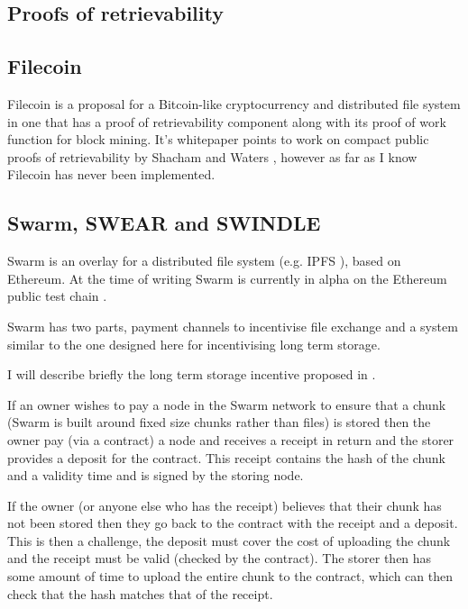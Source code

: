 \documentclass[12pt,a4paper,twoside,openright]{report}
\begin{document}
\subsection{Proofs of retrievability}

\subsection{Filecoin}

Filecoin is a proposal for a Bitcoin-like cryptocurrency and distributed file system in one
that has a proof of retrievability component along with its proof of work function for block mining.
It's whitepaper \cite{filecoin} points to work on compact public proofs of retrievability by Shacham and Waters \cite{compact-por},
however as far as I know Filecoin has never been implemented.

\subsection{Swarm, SWEAR and SWINDLE}

Swarm is an overlay for a distributed file system (e.g. IPFS \cite{ipfs}), based on Ethereum.
At the time of writing Swarm is currently in alpha on the Ethereum public test chain \cite{swarm-alpha}.

Swarm has two parts, payment channels to incentivise file exchange and a system similar to the one designed here for incentivising long term storage.

I will describe briefly the long term storage incentive proposed in \cite{swarm-swear-swindle}.

If an owner wishes to pay a node in the Swarm network to ensure that a chunk (Swarm is built around fixed size chunks rather than files)
is stored then the owner pay (via a contract) a node and receives a receipt in return and the storer provides a deposit for the contract.
This receipt contains the hash of the chunk and a validity time and is signed by the storing node.

If the owner (or anyone else who has the receipt) believes that their chunk has not been stored then they go back to the contract with the receipt and a deposit.
This is then a challenge, the deposit must cover the cost of uploading the chunk and the receipt must be valid (checked by the contract).
The storer then has some amount of time to upload the entire chunk to the contract, which can then check that the hash matches that of the receipt.
\end{document}
